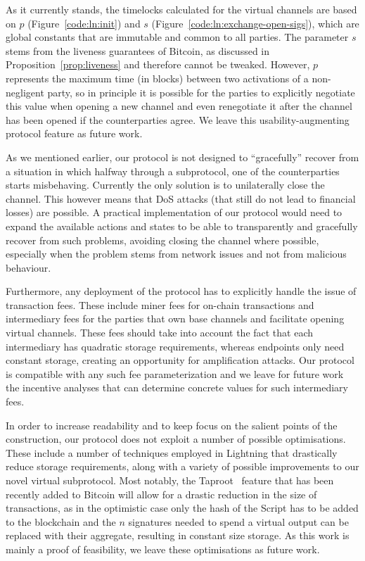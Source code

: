   As it currently stands, the timelocks calculated for the virtual channels are
  based on $p$ (Figure~\ref{code:ln:init}) and $s$
  (Figure~\ref{code:ln:exchange-open-sigs}),
  which are global constants that are immutable and common to all parties. The 
  parameter $s$
  stems from the liveness guarantees of Bitcoin, as discussed in
  Proposition~\ref{prop:liveness} and therefore cannot be tweaked. However, $p$
  represents the maximum time (in blocks) between two activations of a non-negligent party,
  so in principle it is possible for the parties to explicitly negotiate this
  value when opening a new channel and even renegotiate it after the channel has
  been opened if the counterparties agree. We leave this usability-augmenting
  protocol feature as future work.

  As we mentioned earlier, our protocol is not designed to ``gracefully'' recover
  from a situation in which halfway through a subprotocol, one of the
  counterparties starts misbehaving. Currently the only solution is to
  unilaterally close the channel. This however means that DoS attacks (that
  still do not lead to financial losses) are possible. A practical
  implementation of our protocol would need to expand the available actions and
  states to be able to transparently and gracefully recover from such problems,
  avoiding closing the channel where possible, especially when the problem stems
  from network issues and not from malicious behaviour.

  Furthermore, any deployment of the protocol has to explicitly handle the issue
  of transaction fees. These include miner fees for on-chain transactions and
  intermediary fees for the parties that own base channels and facilitate
  opening virtual channels. These fees should take into account the fact that
  each intermediary has quadratic storage requirements, whereas endpoints only
  need constant storage, creating an opportunity for amplification attacks. Our
  protocol is compatible with any such fee parameterization and we leave for
  future work the incentive analyses that can determine concrete values for such
  intermediary fees.

  In order to increase readability and to keep focus on the salient points of
  the construction, our protocol does not exploit a number of possible
  optimisations. These include a number of techniques employed in Lightning that
  drastically reduce storage requirements, along with a variety of possible
  improvements to our novel virtual subprotocol. Most notably, the
  Taproot~\cite{taproot} feature that has been recently added to Bitcoin will
  allow for a
  drastic reduction in the size of transactions, as in the optimistic case only
  the hash of the Script has to be added to the blockchain and the $n$
  signatures needed to spend a virtual output can be replaced with their
  aggregate, resulting in constant size storage. As this work is mainly a proof of
  feasibility, we leave these optimisations as future work.

